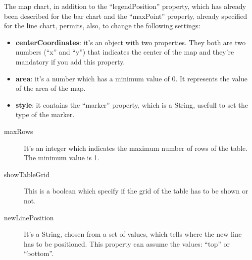 		The map chart, in addition to the “legendPosition” property, which has already been described for the bar chart and the “maxPoint” property, already specified for the line chart, permits, also, to change the following settings:
		\begin{itemize}
			\item \textbf{centerCoordinates}: it's an object with two properties. They both are two numbers (“x” and “y”) that indicates the center of the map and they're mandatory if you add this property.
			\item \textbf{area}: it's a number which has a minimum value of 0. It represents the value of the area of the map.
			\item \textbf{style}: it contains the “marker” property, which is a String, usefull to set the type of the marker.
		\end{itemize}
		\begin{description}
			\item[maxRows] It's an integer which indicates the maximum number of rows of the table. The minimum value is 1.
			\item[showTableGrid] This is a boolean which specify if the grid of the table has to be shown or not.
			\item[newLinePosition] It's a String, chosen from a set of values, which tells where the new line has to be positioned. This property can assume the values: “top” or “bottom”.
		\end{description}

